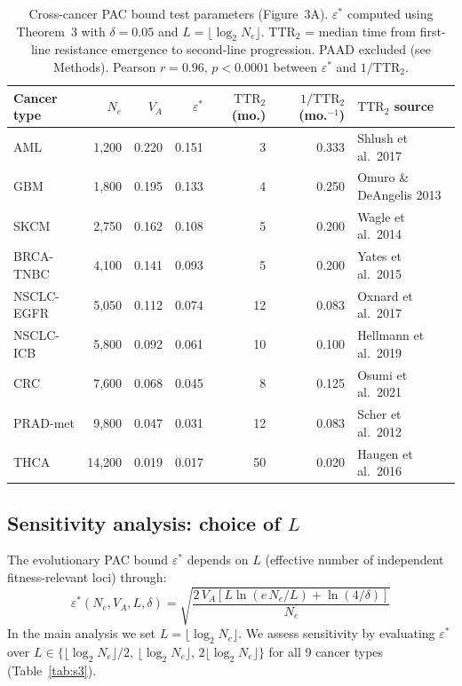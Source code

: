 \documentclass[12pt]{article}
\theoremstyle{remark}
\begin{document}
\begin{table}[ht]
\centering
\caption{Cross-cancer PAC bound test parameters (Figure~3A). $\varepsilon^*$ computed using Theorem~3 with $\delta = 0.05$ and $L = \lfloor\log_2 N_e\rfloor$. $\mathrm{TTR}_2$ = median time from first-line resistance emergence to second-line progression. PAAD excluded (see Methods). Pearson $r = 0.96$, $p < 0.0001$ between $\varepsilon^*$ and $1/\mathrm{TTR}_2$.}
\label{tab:s2}
\small
\begin{tabular}{@{}lrrrrrl@{}}
\toprule
Cancer type & $N_e$ & $V_A$ & $\varepsilon^*$ & $\mathrm{TTR}_2$ (mo.) & $1/\mathrm{TTR}_2$ (mo.$^{-1}$) & $\mathrm{TTR}_2$ source \\
\midrule
AML        & 1,200  & 0.220 & 0.151 & 3  & 0.333 & Shlush et al.\ 2017    \\
GBM        & 1,800  & 0.195 & 0.133 & 4  & 0.250 & Omuro \& DeAngelis 2013 \\
SKCM       & 2,750  & 0.162 & 0.108 & 5  & 0.200 & Wagle et al.\ 2014     \\
BRCA-TNBC  & 4,100  & 0.141 & 0.093 & 5  & 0.200 & Yates et al.\ 2015     \\
NSCLC-EGFR & 5,050  & 0.112 & 0.074 & 12 & 0.083 & Oxnard et al.\ 2017    \\
NSCLC-ICB  & 5,800  & 0.092 & 0.061 & 10 & 0.100 & Hellmann et al.\ 2019  \\
CRC        & 7,600  & 0.068 & 0.045 & 8  & 0.125 & Osumi et al.\ 2021     \\
PRAD-met   & 9,800  & 0.047 & 0.031 & 12 & 0.083 & Scher et al.\ 2012     \\
THCA       & 14,200 & 0.019 & 0.017 & 50 & 0.020 & Haugen et al.\ 2016    \\
\bottomrule
\end{tabular}
\end{table}

\subsection{Sensitivity analysis: choice of $L$}

The evolutionary PAC bound $\varepsilon^*$ depends on $L$ (effective number of independent fitness-relevant loci) through:
\[
  \varepsilon^*(N_e, V_A, L, \delta)
  = \sqrt{\frac{2\,V_A\left[L\ln(e\,N_e/L) + \ln(4/\delta)\right]}{N_e}}
\]
In the main analysis we set $L = \lfloor\log_2 N_e\rfloor$. We assess sensitivity by evaluating $\varepsilon^*$ over $L \in \{\lfloor\log_2 N_e\rfloor/2,\, \lfloor\log_2 N_e\rfloor,\, 2\lfloor\log_2 N_e\rfloor\}$ for all 9 cancer types (Table~\ref{tab:s3}).
\end{document}
